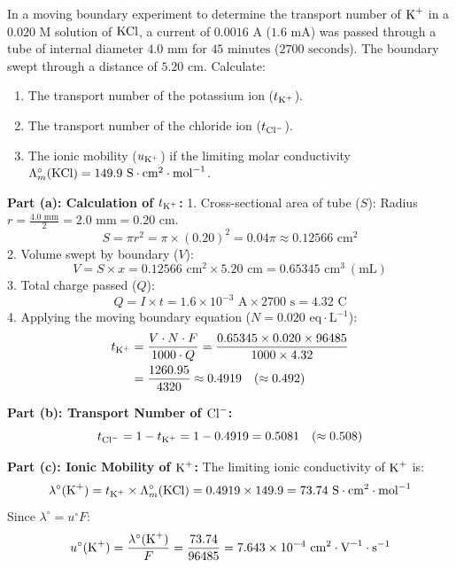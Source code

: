 \begin{examplebox}
In a moving boundary experiment to determine the transport number of $\ce{K+}$ in a $0.020\text{ M}$ solution of $\ce{KCl}$, a current of $0.0016\text{ A}$ ($1.6\text{ mA}$) was passed through a tube of internal diameter $4.0\text{ mm}$ for $45\text{ minutes}$ ($2700\text{ seconds}$). The boundary swept through a distance of $5.20\text{ cm}$. Calculate:
\begin{enumerate}[label=(\alph*)]
    \item The transport number of the potassium ion ($t_{\ce{K+}}$).
    \item The transport number of the chloride ion ($t_{\ce{Cl-}}$).
    \item The ionic mobility ($u_{\ce{K+}}$) if the limiting molar conductivity $\Lambda_m^\circ(\ce{KCl}) = 149.9\ \text{S}\cdot\text{cm}^2\cdot\text{mol}^{-1}$.
\end{enumerate}
\tcblower
\textbf{Part (a): Calculation of $t_{\ce{K+}}$:}
1. Cross-sectional area of tube ($S$):
Radius $r = \frac{4.0\text{ mm}}{2} = 2.0\text{ mm} = 0.20\text{ cm}$.
\begin{equation*}
    S = \pi r^2 = \pi \times (0.20)^2 = 0.04 \pi \approx 0.12566\text{ cm}^2
\end{equation*}
2. Volume swept by boundary ($V$):
\begin{equation*}
    V = S \times x = 0.12566\text{ cm}^2 \times 5.20\text{ cm} = 0.65345\text{ cm}^3\ (\text{mL})
\end{equation*}
3. Total charge passed ($Q$):
\begin{equation*}
    Q = I \times t = 1.6 \times 10^{-3}\text{ A} \times 2700\text{ s} = 4.32\text{ C}
\end{equation*}
4. Applying the moving boundary equation ($N = 0.020\text{ eq}\cdot\text{L}^{-1}$):
\begin{align*}
    t_{\ce{K+}} &= \frac{V \cdot N \cdot F}{1000 \cdot Q} = \frac{0.65345 \times 0.020 \times 96485}{1000 \times 4.32} \\
    &= \frac{1260.95}{4320} \approx 0.4919 \quad (\approx 0.492)
\end{align*}

\textbf{Part (b): Transport Number of $\ce{Cl-}$:}
\begin{equation*}
    t_{\ce{Cl-}} = 1 - t_{\ce{K+}} = 1 - 0.4919 = 0.5081 \quad (\approx 0.508)
\end{equation*}

\textbf{Part (c): Ionic Mobility of $\ce{K+}$:}
The limiting ionic conductivity of $\ce{K+}$ is:
\begin{equation*}
    \lambda^\circ(\ce{K+}) = t_{\ce{K+}} \times \Lambda_m^\circ(\ce{KCl}) = 0.4919 \times 149.9 = 73.74\ \text{S}\cdot\text{cm}^2\cdot\text{mol}^{-1}
\end{equation*}
Since $\lambda^\circ = u^\circ F$:
\begin{equation*}
    u^\circ(\ce{K+}) = \frac{\lambda^\circ(\ce{K+})}{F} = \frac{73.74}{96485} = 7.643 \times 10^{-4}\ \text{cm}^2\cdot\text{V}^{-1}\cdot\text{s}^{-1}
\end{equation*}
\end{examplebox}
